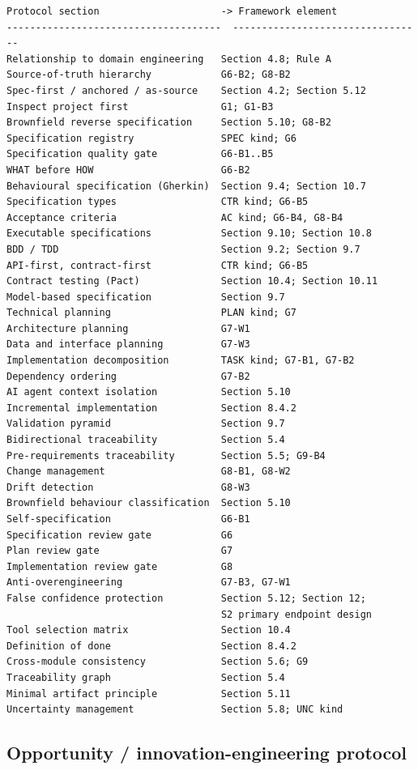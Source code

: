 \documentclass[11pt,a4paper]{article}
\begin{document}
\begin{Verbatim}[fontsize=\footnotesize,breaklines=true,breakanywhere=true,breakautoindent=false,samepage=false]
Protocol section                     -> Framework element
-------------------------------------  ---------------------------------
Relationship to domain engineering   Section 4.8; Rule A
Source-of-truth hierarchy            G6-B2; G8-B2
Spec-first / anchored / as-source    Section 4.2; Section 5.12
Inspect project first                G1; G1-B3
Brownfield reverse specification     Section 5.10; G8-B2
Specification registry               SPEC kind; G6
Specification quality gate           G6-B1..B5
WHAT before HOW                      G6-B2
Behavioural specification (Gherkin)  Section 9.4; Section 10.7
Specification types                  CTR kind; G6-B5
Acceptance criteria                  AC kind; G6-B4, G8-B4
Executable specifications            Section 9.10; Section 10.8
BDD / TDD                            Section 9.2; Section 9.7
API-first, contract-first            CTR kind; G6-B5
Contract testing (Pact)              Section 10.4; Section 10.11
Model-based specification            Section 9.7
Technical planning                   PLAN kind; G7
Architecture planning                G7-W1
Data and interface planning          G7-W3
Implementation decomposition         TASK kind; G7-B1, G7-B2
Dependency ordering                  G7-B2
AI agent context isolation           Section 5.10
Incremental implementation           Section 8.4.2
Validation pyramid                   Section 9.7
Bidirectional traceability           Section 5.4
Pre-requirements traceability        Section 5.5; G9-B4
Change management                    G8-B1, G8-W2
Drift detection                      G8-W3
Brownfield behaviour classification  Section 5.10
Self-specification                   G6-B1
Specification review gate            G6
Plan review gate                     G7
Implementation review gate           G8
Anti-overengineering                 G7-B3, G7-W1
False confidence protection          Section 5.12; Section 12;
                                     S2 primary endpoint design
Tool selection matrix                Section 10.4
Definition of done                   Section 8.4.2
Cross-module consistency             Section 5.6; G9
Traceability graph                   Section 5.4
Minimal artifact principle           Section 5.11
Uncertainty management               Section 5.8; UNC kind
\end{Verbatim}

\subsection{Opportunity / innovation-engineering protocol}
\end{document}
